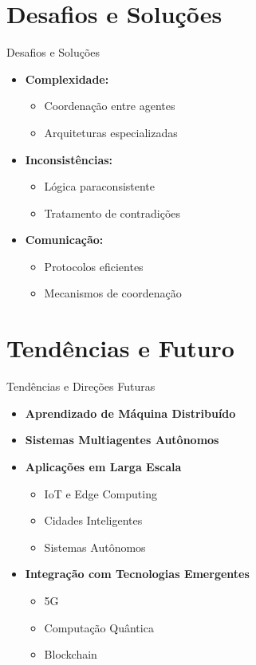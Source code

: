 \documentclass[aspectratio=169,xcolor=table]{beamer}
\begin{document}
\section{Desafios e Soluções}
\begin{frame}{Desafios e Soluções}
    \begin{itemize}
        \item \textbf{Complexidade:}
        \begin{itemize}
            \item Coordenação entre agentes
            \item Arquiteturas especializadas
        \end{itemize}
        \item \textbf{Inconsistências:}
        \begin{itemize}
            \item Lógica paraconsistente
            \item Tratamento de contradições
        \end{itemize}
        \item \textbf{Comunicação:}
        \begin{itemize}
            \item Protocolos eficientes
            \item Mecanismos de coordenação
        \end{itemize}
    \end{itemize}
\end{frame}

\section{Tendências e Futuro}
\begin{frame}{Tendências e Direções Futuras}
    \begin{itemize}
        \item \textbf{Aprendizado de Máquina Distribuído}
        \item \textbf{Sistemas Multiagentes Autônomos}
        \item \textbf{Aplicações em Larga Escala}
        \begin{itemize}
            \item IoT e Edge Computing
            \item Cidades Inteligentes
            \item Sistemas Autônomos
        \end{itemize}
        \item \textbf{Integração com Tecnologias Emergentes}
        \begin{itemize}
            \item 5G
            \item Computação Quântica
            \item Blockchain
        \end{itemize}
    \end{itemize}
\end{frame}
\end{document}
